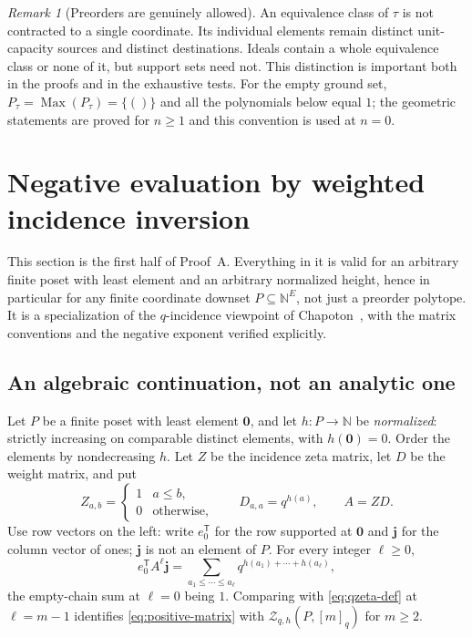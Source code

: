 \documentclass[11pt]{article}
\numberwithin{equation}{section}
\theoremstyle{definition}
\theoremstyle{remark}
\newtheorem{remark}[theorem]{Remark}
\newcommand{\N}{\mathbb N}
\newcommand{\zero}{\mathbf 0}
\newcommand{\Max}{\operatorname{Max}}
\newcommand{\qint}[1]{[#1]_q}
\newcommand{\Zeta}{\mathcal Z}
\begin{document}
\begin{remark}[Preorders are genuinely allowed]
An equivalence class of $\tau$ is not contracted to a single coordinate. Its
individual elements remain distinct unit-capacity sources and distinct
destinations. Ideals contain a whole equivalence class or none of it, but
support sets need not. This distinction is important both in the proofs and
in the exhaustive tests. For the empty ground set,
$P_\tau=\Max(P_\tau)=\{()\}$ and all the polynomials below equal $1$; the
geometric statements are proved for $n\ge1$ and this convention is used at
$n=0$.
\end{remark}

\section{Negative evaluation by weighted incidence inversion}
\label{sec:incidence}

This section is the first half of Proof~A. Everything in it is valid for an
arbitrary finite poset with least element and an arbitrary normalized height,
hence in particular for any finite coordinate downset $P\subseteq\N^E$, not
just a preorder polytope. It is a specialization of the $q$-incidence
viewpoint of Chapoton~\cite[Appendix~C]{Chapoton}, with the matrix conventions
and the negative exponent verified explicitly.

\subsection{An algebraic continuation, not an analytic one}

Let $P$ be a finite poset with least element $\zero$, and let $h:P\to\N$ be
\emph{normalized}: strictly increasing on comparable distinct elements, with
$h(\zero)=0$. Order the elements by nondecreasing $h$. Let $Z$ be the
incidence zeta matrix, let $D$ be the weight matrix, and put
\begin{equation}
 Z_{a,b}=\begin{cases}1&a\le b,\\0&\text{otherwise},\end{cases}
 \qquad D_{a,a}=q^{h(a)},\qquad A=ZD.
 \label{eq:matrices}
\end{equation}
Use row vectors on the left: write $e_0^{\mathsf T}$ for the row supported at
$\zero$ and $\mathbf j$ for the column vector of ones; $\mathbf j$ is not an
element of $P$. For every integer $\ell\ge0$,
\begin{equation}
 e_0^{\mathsf T}A^{\ell}\mathbf j
 =\sum_{a_1\le\cdots\le a_{\ell}}
   q^{h(a_1)+\cdots+h(a_{\ell})},
 \label{eq:positive-matrix}
\end{equation}
the empty-chain sum at $\ell=0$ being $1$. Comparing with
\eqref{eq:qzeta-def} at $\ell=m-1$ identifies \eqref{eq:positive-matrix} with
$\Zeta_{q,h}(P,\qint m)$ for $m\ge2$.
\end{document}
